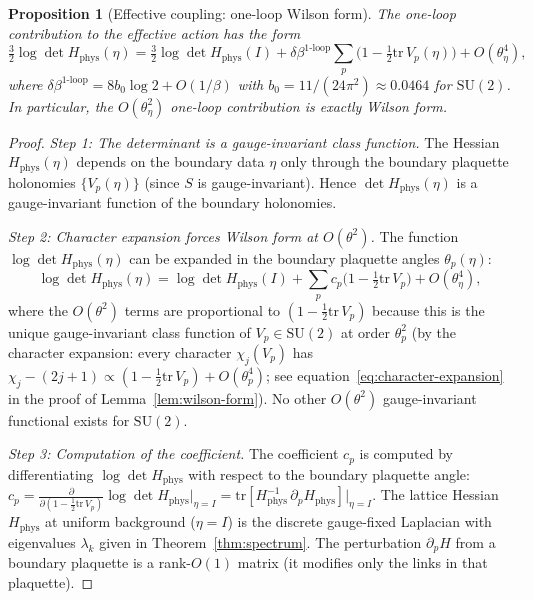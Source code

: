 \documentclass[11pt]{article}
\newtheorem{proposition}[theorem]{Proposition}
\theoremstyle{definition}
\newcommand{\SU}{\mathrm{SU}}
\newcommand{\tr}{\mathrm{tr}}
\begin{document}
\begin{proposition}[Effective coupling: one-loop Wilson form]%
\label{prop:betaeff}
The one-loop contribution to the effective action has the form
\begin{equation}\label{eq:betaeff}
\tfrac{3}{2}\log\det H_{\mathrm{phys}}(\eta)
=\tfrac{3}{2}\log\det H_{\mathrm{phys}}(I)
+\delta\beta^{1\text{-loop}}\sum_p
\bigl(1-\tfrac{1}{2}\tr\,V_p(\eta)\bigr)
+O(\theta_\eta^4),
\end{equation}
where $\delta\beta^{1\text{-loop}}=8b_0\log 2+O(1/\beta)$
with $b_0=11/(24\pi^2)\approx 0.0464$ for $\SU(2)$.
In particular, the $O(\theta_\eta^2)$ one-loop contribution
is exactly Wilson form.
\end{proposition}

\begin{proof}
\emph{Step 1: The determinant is a gauge-invariant class function.}
The Hessian $H_{\mathrm{phys}}(\eta)$ depends on the boundary data
$\eta$ only through the boundary plaquette holonomies
$\{V_p(\eta)\}$ (since $S$ is gauge-invariant).  Hence
$\det H_{\mathrm{phys}}(\eta)$ is a gauge-invariant function
of the boundary holonomies.

\emph{Step 2: Character expansion forces Wilson form at $O(\theta^2)$.}
The function $\log\det H_{\mathrm{phys}}(\eta)$ can be expanded
in the boundary plaquette angles $\theta_p(\eta)$:
\[
\log\det H_{\mathrm{phys}}(\eta)
=\log\det H_{\mathrm{phys}}(I)
+\sum_p c_p\bigl(1-\tfrac{1}{2}\tr\,V_p\bigr)
+O(\theta_\eta^4),
\]
where the $O(\theta^2)$ terms are proportional to
$(1-\frac{1}{2}\tr\,V_p)$ because this is the unique
gauge-invariant class function of $V_p\in\SU(2)$ at order
$\theta_p^2$ (by the character expansion: every character
$\chi_j(V_p)$ has $\chi_j-(2j+1)\propto
(1-\frac{1}{2}\tr\,V_p)+O(\theta_p^4)$;
see equation~\eqref{eq:character-expansion} in the proof
of Lemma~\ref{lem:wilson-form}).
No other $O(\theta^2)$ gauge-invariant functional exists for
$\SU(2)$.

\emph{Step 3: Computation of the coefficient.}
The coefficient $c_p$ is computed by differentiating
$\log\det H_{\mathrm{phys}}$ with respect to the boundary
plaquette angle:
$c_p=\frac{\partial}{\partial(1-\frac{1}{2}\tr\,V_p)}
\log\det H_{\mathrm{phys}}\big|_{\eta=I}
=\tr[H_{\mathrm{phys}}^{-1}\,\partial_p H_{\mathrm{phys}}]
\big|_{\eta=I}$.
The lattice Hessian $H_{\mathrm{phys}}$ at uniform background
($\eta=I$) is the discrete gauge-fixed Laplacian with
eigenvalues $\lambda_k$ given in
Theorem~\ref{thm:spectrum}.
The perturbation $\partial_p H$ from a boundary plaquette
is a rank-$O(1)$ matrix (it modifies only the links in that
plaquette).


\end{proof}
\end{document}
